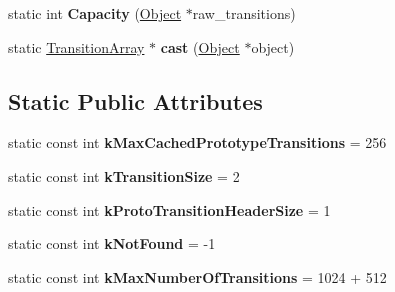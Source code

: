 \begin{DoxyCompactItemize}
\item 
static int {\bfseries Capacity} (\hyperlink{classv8_1_1internal_1_1_object}{Object} $\ast$raw\+\_\+transitions)\hypertarget{classv8_1_1internal_1_1_transition_array_a65c544d9ec2507a985000182bd77125a}{}\label{classv8_1_1internal_1_1_transition_array_a65c544d9ec2507a985000182bd77125a}

\item 
static \hyperlink{classv8_1_1internal_1_1_transition_array}{Transition\+Array} $\ast$ {\bfseries cast} (\hyperlink{classv8_1_1internal_1_1_object}{Object} $\ast$object)\hypertarget{classv8_1_1internal_1_1_transition_array_ab88d7d66ebea6f7fde9c78b2d08d25e7}{}\label{classv8_1_1internal_1_1_transition_array_ab88d7d66ebea6f7fde9c78b2d08d25e7}

\end{DoxyCompactItemize}
\subsection*{Static Public Attributes}
\begin{DoxyCompactItemize}
\item 
static const int {\bfseries k\+Max\+Cached\+Prototype\+Transitions} = 256\hypertarget{classv8_1_1internal_1_1_transition_array_adbecf4f3a5f03b891c64f4e44397c7dc}{}\label{classv8_1_1internal_1_1_transition_array_adbecf4f3a5f03b891c64f4e44397c7dc}

\item 
static const int {\bfseries k\+Transition\+Size} = 2\hypertarget{classv8_1_1internal_1_1_transition_array_a70f4cab2687143d4e358a74001ce02ce}{}\label{classv8_1_1internal_1_1_transition_array_a70f4cab2687143d4e358a74001ce02ce}

\item 
static const int {\bfseries k\+Proto\+Transition\+Header\+Size} = 1\hypertarget{classv8_1_1internal_1_1_transition_array_acc80d2c6989d10b2c1af22450f28db13}{}\label{classv8_1_1internal_1_1_transition_array_acc80d2c6989d10b2c1af22450f28db13}

\item 
static const int {\bfseries k\+Not\+Found} = -\/1\hypertarget{classv8_1_1internal_1_1_transition_array_a7d68801878e5dc9587483ec914d7522b}{}\label{classv8_1_1internal_1_1_transition_array_a7d68801878e5dc9587483ec914d7522b}

\item 
static const int {\bfseries k\+Max\+Number\+Of\+Transitions} = 1024 + 512\hypertarget{classv8_1_1internal_1_1_transition_array_ae856479a42fb3a4de483e48a99c6cca1}{}\label{classv8_1_1internal_1_1_transition_array_ae856479a42fb3a4de483e48a99c6cca1}

\end{DoxyCompactItemize}
